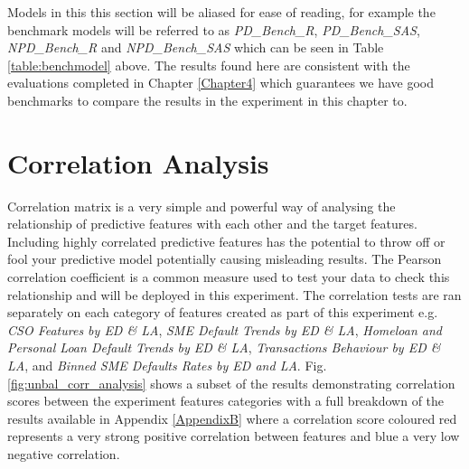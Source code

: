 Models in this this section will be aliased for ease of reading, for example the benchmark models will be referred to as \textit{PD\_Bench\_R}, \textit{PD\_Bench\_SAS}, \textit{NPD\_Bench\_R} and \textit{NPD\_Bench\_SAS} which can be seen in Table \ref{table:benchmodel} above. The results found here are consistent with the evaluations completed in Chapter \ref{Chapter4} which guarantees we have good benchmarks to compare the results in the experiment in this chapter to.


\section{Correlation Analysis}
Correlation matrix is a very simple and powerful way of analysing the relationship of predictive features with each other and the target features. Including highly correlated predictive features has the potential to throw off or fool your predictive model potentially causing misleading results. The Pearson correlation coefficient is a common measure used to test your data to check this relationship and will be deployed in this experiment. The correlation tests are ran separately on each category of features created as part of this experiment e.g. \textit{CSO Features by ED \& LA}, \textit{SME Default Trends by ED \& LA}, \textit{Homeloan and Personal Loan Default Trends by ED \& LA}, \textit{Transactions Behaviour by ED \& LA}, and \textit{Binned SME Defaults Rates by ED and LA}. Fig. \ref{fig:unbal_corr_analysis} shows a subset of the results demonstrating correlation scores between the experiment features categories with a full breakdown of the results available in Appendix \ref{AppendixB} where a correlation score coloured red represents a very strong positive correlation between features and blue a very low negative correlation.

